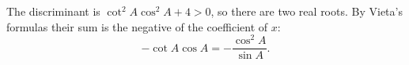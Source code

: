 The discriminant is $\cot^2A\cos^2A+4>0$, so there are two real roots. By Vieta's formulas their sum is the negative of the coefficient of $x$:
\[\boxed{-\cot A\cos A=-\dfrac{\cos^2A}{\sin A}}.\]
